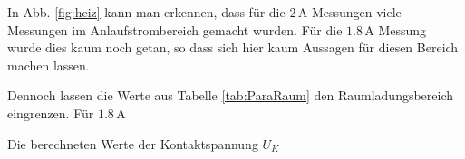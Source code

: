 \documentclass[12pt,a4paper,titlepage,headinclude,bibtotoc]{scrartcl}
\begin{document}
In Abb. \ref{fig:heiz} kann man erkennen, dass für die $2\,$A Messungen viele Messungen im Anlaufstrombereich gemacht wurden.
Für die $1.8\,$A Messung wurde dies kaum noch getan, so dass sich hier kaum Aussagen für diesen Bereich machen lassen.

Dennoch lassen die Werte aus Tabelle \ref{tab:ParaRaum} den Raumladungsbereich eingrenzen.
Für $1.8\,$A 


Die berechneten Werte der Kontaktspannung $U_K$ 



\end{document}
